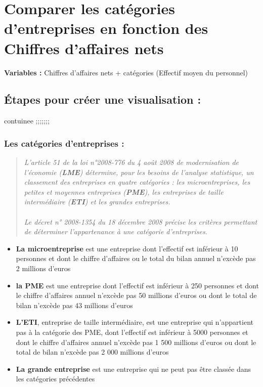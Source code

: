 \documentclass[mstat,12pt]{unswthesis}
\begin{document}
\section{\texorpdfstring{\textbf{Comparer les catégories d'entreprises
en fonction des Chiffres d'affaires
nets}}{Comparer les catégories d'entreprises en fonction des Chiffres d'affaires nets}}\label{comparer-les-catuxe9gories-dentreprises-en-fonction-des-chiffres-daffaires-nets}

\bigskip

\textbf{Variables :} Chiffres d'affaires nets + catégories (Effectif
moyen du personnel)

\subsection{Étapes pour créer une visualisation
:}\label{uxe9tapes-pour-cruxe9er-une-visualisation}

contuinee ;;;;;;;

\subsubsection{Les catégories d'entreprises
:}\label{les-catuxe9gories-dentreprises}

\bigskip
\scriptsize
\begin{quote}
\textit{L’article 51 de la loi n°2008-776 du 4 août 2008 de modernisation de l’économie (\textbf{LME}) détermine, pour les besoins de l’analyse statistique, un classement des entreprises en quatre catégories : les microentreprises, les petites et moyennes entreprises (\textbf{PME}), les entreprises de taille intermédiaire (\textbf{ETI}) et les grandes entreprises.\\ \\Le décret n° 2008-1354 du 18 décembre 2008 précise les critères permettant de déterminer l’appartenance à une catégorie d'entreprises.}
\end{quote}
\normalsize

\begin{itemize}[label=$\circ$]
  \item \textnormal{ \textbf{La microentreprise} est une entreprise dont l'effectif est inférieur à 10 personnes et dont le chiffre d'affaires ou le total du bilan annuel n'excède pas 2 millions d'euros}
\item \textnormal{ \textbf{la PME} est une entreprise dont l’effectif est inférieur à 250 personnes
et dont le chiffre d’affaires annuel n'excède pas 50 millions d'euros ou
dont le total de bilan n'excède pas 43 millions d'euros }
\item \textnormal{\textbf{L'ETI}, entreprise de taille intermédiaire, est une entreprise qui n'appartient pas à la catégorie des PME, dont l’effectif est inférieur à 5000 personnes et dont le chiffre d'affaires annuel n'excède pas 1 500 millions d'euros ou dont le total de bilan n'excède pas 2 000 millions d'euros}
\item \textnormal{\textbf{La grande entreprise} est une entreprise qui ne peut pas être classée
dans les catégories précédentes}
\end{itemize}
\newpage
\end{document}
